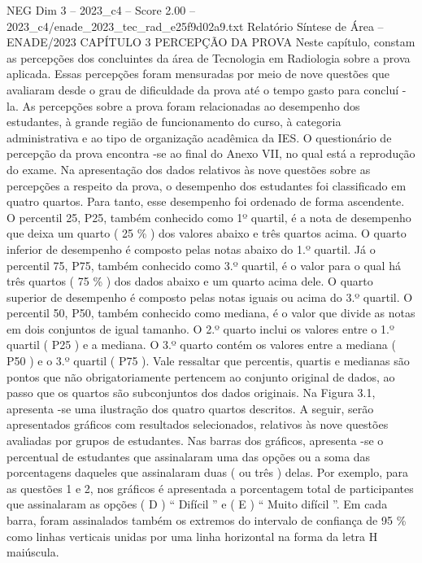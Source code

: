 \begin{textsample}{NEG Dim 3 – 2023\_c4 – Score 2.00 – 2023\_c4/enade\_2023\_tec\_rad\_e25f9d02a9.txt}  \label{ex:f3_neg_210}
Relatório Síntese de Área – ENADE/2023 CAPÍTULO 3 PERCEPÇÃO DA PROVA Neste capítulo, constam as percepções dos concluintes da área de Tecnologia em Radiologia sobre a prova aplicada.
Essas percepções foram mensuradas por meio de nove questões que avaliaram desde o grau de dificuldade da prova até o tempo gasto para concluí -la.
As percepções sobre a prova foram relacionadas ao desempenho dos estudantes, à grande região de funcionamento do curso, à categoria administrativa e ao tipo de organização acadêmica da IES.
O questionário de percepção da prova encontra -se ao final do Anexo VII, no qual está a reprodução do exame.
Na apresentação dos dados relativos às nove questões sobre as percepções a respeito da prova, o desempenho dos estudantes foi classificado em quatro quartos.
Para tanto, esse desempenho foi ordenado de forma ascendente.
O percentil 25, P25, também conhecido como 1º quartil, é a nota de desempenho que deixa um quarto ( 25 \% ) dos valores abaixo e três quartos acima.
O quarto inferior de desempenho é composto pelas notas abaixo do 1.º quartil.
Já o percentil 75, P75, também conhecido como 3.º quartil, é o valor para o qual há três quartos ( 75 \% ) dos dados abaixo e um quarto acima dele.
O quarto superior de desempenho é composto pelas notas iguais ou acima do 3.º quartil.
O percentil 50, P50, também conhecido como mediana, é o valor que divide as notas em dois conjuntos de igual tamanho.
O 2.º quarto inclui os valores entre o 1.º quartil ( P25 ) e a mediana.
O 3.º quarto contém os valores entre a mediana ( P50 ) e o 3.º quartil ( P75 ).
Vale ressaltar que percentis, quartis e medianas são pontos que não obrigatoriamente pertencem ao conjunto original de dados, ao passo que os quartos são subconjuntos dos dados originais.
Na Figura 3.1, apresenta -se uma ilustração dos quatro quartos descritos.
A seguir, serão apresentados gráficos com resultados selecionados, relativos às nove questões avaliadas por grupos de estudantes.
Nas barras dos gráficos, apresenta -se o percentual de estudantes que assinalaram uma das opções ou a soma das porcentagens daqueles que assinalaram duas ( ou três ) delas.
Por exemplo, para as questões 1 e 2, nos gráficos é apresentada a porcentagem total de participantes que assinalaram as opções ( D ) “ Difícil ” e ( E ) “ Muito difícil ”.
Em cada barra, foram assinalados também os extremos do intervalo de confiança de 95 \% como linhas verticais unidas por uma linha horizontal na forma da letra H maiúscula.

\end{textsample}
